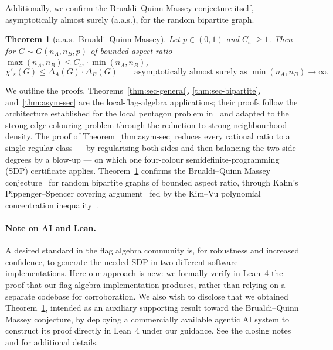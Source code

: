 \documentclass[11pt,a4paper]{article}
\newtheorem{theorem}{Theorem}[section]
\theoremstyle{definition}
\theoremstyle{remark}
\begin{document}
Additionally, we confirm the Brualdi--Quinn Massey conjecture itself,
asymptotically almost surely (a.a.s.), for the random bipartite graph.

\begin{theorem}[a.a.s.\ Brualdi--Quinn Massey]
\label{thm:bq-random}
Let $p \in (0, 1)$ and $C_{\mathrm{ar}} \geq 1$. Then for
$G \sim G(n_A, n_B, p)$ of bounded aspect ratio
$\max(n_A, n_B) \leq C_{\mathrm{ar}} \cdot \min(n_A, n_B)$,
\[
\chi'_s(G) \leq \Delta_A(G) \cdot \Delta_B(G)
\qquad\text{asymptotically almost surely as }
\min(n_A, n_B) \to \infty.
\]
\end{theorem}

We outline the proofs. 
Theorems~\ref{thm:sec-general}, \ref{thm:sec-bipartite},
and~\ref{thm:asym-sec} are the local-flag-algebra applications; their
proofs follow the architecture established for the local pentagon problem
in~\cite{daveyPentagonLocalFlags2026} and adapted to the
strong edge-colouring problem through the reduction to
strong-neighbourhood density.
The proof of Theorem~\ref{thm:asym-sec} reduces every rational ratio
to a single regular class --- by regularising both sides and then
balancing the two side degrees by a blow-up --- on which one
four-colour semidefinite-programming (SDP) certificate applies.
Theorem~\ref{thm:bq-random} confirms the
Brualdi--Quinn Massey conjecture~\cite{brualdiIncidenceStrongEdge1993}
for random bipartite graphs of bounded aspect ratio, through Kahn's
Pippenger--Spencer covering argument~\cite{kahnAsymptoticEdgeColoring1996}
fed by the Kim--Vu polynomial concentration
inequality~\cite{kimVuConcentration2000}.

\paragraph{Note on AI and Lean.}

A desired standard in the flag algebra community is, for robustness and increased confidence, to generate the needed SDP in two different software implementations.
Here our approach is new: we formally verify in Lean~4 the proof that our flag-algebra implementation produces, rather than relying on a separate codebase for corroboration.
We also wish to disclose that we obtained Theorem~\ref{thm:bq-random}, intended as an auxiliary supporting result toward the Brualdi--Quinn Massey conjecture, by deploying a commercially available agentic AI system to construct its proof directly in Lean~4 under our guidance.
See the closing notes \textit{} and \textit{} for additional details.
\end{document}
